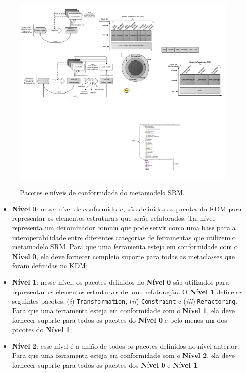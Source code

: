 \begin{figure}[h]
	\centering
		\caption{Pacotes e níveis de conformidade do metamodelo SRM.}
	\includegraphics[scale=1]{images/pacotesSRM}
	\label{fig:pacotes_SRM_conformidade_level}
	\fautor
\end{figure}

\begin{itemize}
    \item \textbf{Nível 0}: nesse nível de conformidade, são definidos os pacotes do KDM para representar os elementos estruturais que serão refatorados. Tal nível, representa um denominador comum que pode servir como uma base para a interoperabilidade entre diferentes categorias de ferramentas que utilizem o metamodelo SRM. Para que uma ferramenta esteja em conformidade com o \textbf{Nível 0}, ela deve fornecer completo suporte para todas as metaclasses que foram definidas no KDM;
    \item \textbf{Nível 1}: nesse nível, os pacotes definidos no \textbf{Nível 0} são utilizados para representar os elementos estruturais de uma refatoração. O \textbf{Nível 1} define os seguintes pacotes: (\textit{i}) \texttt{Transformation}, (\textit{ii}) \texttt{Constraint} e (\textit{iii}) \texttt{Refactoring}. Para que uma ferramenta esteja em conformidade com o \textbf{Nível 1}, ela deve fornecer suporte para todos os pacotes do \textbf{Nível 0} e pelo menos um dos pacotes do \textbf{Nível 1};
    \item \textbf{Nível 2}: esse nível é a união de todos os pacotes definidos no nível anterior. Para que uma ferramenta esteja em conformidade com o \textbf{Nível 2}, ela deve fornecer suporte para todos os pacotes dos \textbf{Nível 0} e \textbf{Nível 1}.
\end{itemize}

